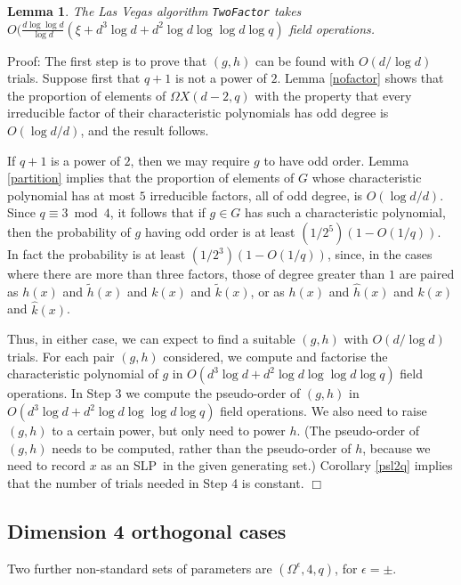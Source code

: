 \documentclass[12pt]{article}
\newtheorem{lemma}[definition]{Lemma}
\newenvironment{proof}{\normalsize {\sc Proof}:}{{\hfill $\Box$ \\}}
\def\Oh{O}  %
\def\SLP{{\rm SLP}}
\begin{document}
\begin{lemma} \label{2factor}
The Las Vegas algorithm {\tt TwoFactor} takes 
$\Oh(\frac{d \log\log d}{\log d} 
(\xi + d^3 \log d + d^2 \log d \log\log d \log q)$ field operations.
\end{lemma}
\begin{proof}
The first step is to prove that $(g,h)$ can be found 
with $\Oh(d/\log d)$ trials.
Suppose first that $q+1$ is not a power of $2$. 
Lemma \ref{nofactor} shows that 
the proportion of elements of
$\Omega X(d-2,q)$ with the property that
every irreducible factor of their characteristic polynomials 
has odd degree is $\Oh(\log d /d)$, and the result follows.

If $q+1$ is a power of $2$, then we may require $g$ to have odd order.
Lemma \ref{partition} implies that the proportion of elements of 
$G$ whose characteristic polynomial has at most $5$ irreducible factors, all
of odd degree, is $\Oh(\log d/d)$.  Since $q\equiv3\bmod4$, it follows
that if $g\in G$ has such a characteristic polynomial, then the probability of 
$g$ having odd order is at least $(1/2^5)(1-\Oh(1/q))$. In fact the probability
is at least $(1/2^3)(1-\Oh(1/q))$, since, in the cases where there 
are more than three factors, those of degree greater than $1$ are 
paired as $h(x)$ and $\tilde{h}(x)$
and $k(x)$ and $\tilde{k}(x)$, or as $h(x)$ and $\hat{h}(x)$
and $k(x)$ and $\hat{k}(x)$.

Thus, in either case, we can expect to find a suitable
$(g,h)$ with $\Oh(d/\log d)$ trials.
For each pair $(g,h)$ considered, we compute and factorise
the characteristic polynomial of $g$ in 
$\Oh(d^3\log d + d^2 \log d \log\log d \log q)$ field operations.
In Step 3 we compute the pseudo-order of $(g,h)$ in 
$\Oh(d^3\log d + d^2 \log d \log\log d \log q)$ field operations.
We also need to raise $(g,h)$ to a certain power, but 
only need to power $h$.
(The pseudo-order of $(g,h)$
needs to be computed, rather than the pseudo-order of $h$,
because we need to record $x$ as an \SLP\ in the given generating set.)
Corollary \ref{psl2q} implies that the number of trials 
needed in Step 4 is constant.
\end{proof}

\subsection{Dimension 4 orthogonal cases}
Two further non-standard sets of parameters 
are $(\Omega^\epsilon,4,q)$, for $\epsilon =\pm$.  
\end{document}
